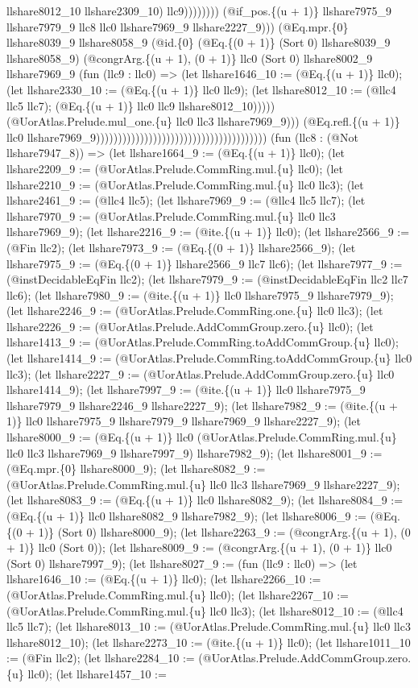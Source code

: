 \documentclass[11pt]{article}
\begin{document}
llshare8012\_10 llshare2309\_10) llc9)))))))) (@if\_pos.\{(u + 1)\} llshare7975\_9 llshare7979\_9 llc8 llc0 llshare7969\_9 llshare2227\_9))) (@Eq.mpr.\{0\} llshare8039\_9 llshare8058\_9 (@id.\{0\} (@Eq.\{(0 + 1)\} (Sort 0) llshare8039\_9 llshare8058\_9) (@congrArg.\{(u + 1), (0 + 1)\} llc0 (Sort 0) llshare8002\_9 llshare7969\_9 (fun (llc9 : llc0) => (let llshare1646\_10 := (@Eq.\{(u + 1)\} llc0); (let llshare2330\_10 := (@Eq.\{(u + 1)\} llc0 llc9); (let llshare8012\_10 := (@llc4 llc5 llc7); (@Eq.\{(u + 1)\} llc0 llc9 llshare8012\_10))))) (@UorAtlas.Prelude.mul\_one.\{u\} llc0 llc3 llshare7969\_9))) (@Eq.refl.\{(u + 1)\} llc0 llshare7969\_9))))))))))))))))))))))))))))))))))))))) (fun (llc8 : (@Not llshare7947\_8)) => (let llshare1664\_9 := (@Eq.\{(u + 1)\} llc0); (let llshare2209\_9 := (@UorAtlas.Prelude.CommRing.mul.\{u\} llc0); (let llshare2210\_9 := (@UorAtlas.Prelude.CommRing.mul.\{u\} llc0 llc3); (let llshare2461\_9 := (@llc4 llc5); (let llshare7969\_9 := (@llc4 llc5 llc7); (let llshare7970\_9 := (@UorAtlas.Prelude.CommRing.mul.\{u\} llc0 llc3 llshare7969\_9); (let llshare2216\_9 := (@ite.\{(u + 1)\} llc0); (let llshare2566\_9 := (@Fin llc2); (let llshare7973\_9 := (@Eq.\{(0 + 1)\} llshare2566\_9); (let llshare7975\_9 := (@Eq.\{(0 + 1)\} llshare2566\_9 llc7 llc6); (let llshare7977\_9 := (@instDecidableEqFin llc2); (let llshare7979\_9 := (@instDecidableEqFin llc2 llc7 llc6); (let llshare7980\_9 := (@ite.\{(u + 1)\} llc0 llshare7975\_9 llshare7979\_9); (let llshare2246\_9 := (@UorAtlas.Prelude.CommRing.one.\{u\} llc0 llc3); (let llshare2226\_9 := (@UorAtlas.Prelude.AddCommGroup.zero.\{u\} llc0); (let llshare1413\_9 := (@UorAtlas.Prelude.CommRing.toAddCommGroup.\{u\} llc0); (let llshare1414\_9 := (@UorAtlas.Prelude.CommRing.toAddCommGroup.\{u\} llc0 llc3); (let llshare2227\_9 := (@UorAtlas.Prelude.AddCommGroup.zero.\{u\} llc0 llshare1414\_9); (let llshare7997\_9 := (@ite.\{(u + 1)\} llc0 llshare7975\_9 llshare7979\_9 llshare2246\_9 llshare2227\_9); (let llshare7982\_9 := (@ite.\{(u + 1)\} llc0 llshare7975\_9 llshare7979\_9 llshare7969\_9 llshare2227\_9); (let llshare8000\_9 := (@Eq.\{(u + 1)\} llc0 (@UorAtlas.Prelude.CommRing.mul.\{u\} llc0 llc3 llshare7969\_9 llshare7997\_9) llshare7982\_9); (let llshare8001\_9 := (@Eq.mpr.\{0\} llshare8000\_9); (let llshare8082\_9 := (@UorAtlas.Prelude.CommRing.mul.\{u\} llc0 llc3 llshare7969\_9 llshare2227\_9); (let llshare8083\_9 := (@Eq.\{(u + 1)\} llc0 llshare8082\_9); (let llshare8084\_9 := (@Eq.\{(u + 1)\} llc0 llshare8082\_9 llshare7982\_9); (let llshare8006\_9 := (@Eq.\{(0 + 1)\} (Sort 0) llshare8000\_9); (let llshare2263\_9 := (@congrArg.\{(u + 1), (0 + 1)\} llc0 (Sort 0)); (let llshare8009\_9 := (@congrArg.\{(u + 1), (0 + 1)\} llc0 (Sort 0) llshare7997\_9); (let llshare8027\_9 := (fun (llc9 : llc0) => (let llshare1646\_10 := (@Eq.\{(u + 1)\} llc0); (let llshare2266\_10 := (@UorAtlas.Prelude.CommRing.mul.\{u\} llc0); (let llshare2267\_10 := (@UorAtlas.Prelude.CommRing.mul.\{u\} llc0 llc3); (let llshare8012\_10 := (@llc4 llc5 llc7); (let llshare8013\_10 := (@UorAtlas.Prelude.CommRing.mul.\{u\} llc0 llc3 llshare8012\_10); (let llshare2273\_10 := (@ite.\{(u + 1)\} llc0); (let llshare1011\_10 := (@Fin llc2); (let llshare2284\_10 := (@UorAtlas.Prelude.AddCommGroup.zero.\{u\} llc0); (let llshare1457\_10 := 
\end{document}
